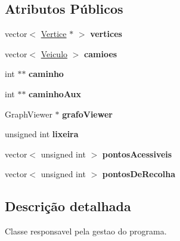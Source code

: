 \subsection*{Atributos Públicos}
\begin{DoxyCompactItemize}
\item 
\hypertarget{class_gestor_a36621d23bfbb03528e02156d6db98d1f}{vector$<$ \hyperlink{class_vertice}{Vertice} $\ast$ $>$ {\bfseries vertices}}\label{class_gestor_a36621d23bfbb03528e02156d6db98d1f}

\item 
\hypertarget{class_gestor_a163c7e5d2f461326bd5278569b2c50e0}{vector$<$ \hyperlink{class_veiculo}{Veiculo} $>$ {\bfseries camioes}}\label{class_gestor_a163c7e5d2f461326bd5278569b2c50e0}

\item 
\hypertarget{class_gestor_ac31b8b9f6a11e8ad3c3a4ee4b24ef1f9}{int $\ast$$\ast$ {\bfseries caminho}}\label{class_gestor_ac31b8b9f6a11e8ad3c3a4ee4b24ef1f9}

\item 
\hypertarget{class_gestor_ac8ddb489e5cba88a19768dd8a9d2aa11}{int $\ast$$\ast$ {\bfseries caminho\-Aux}}\label{class_gestor_ac8ddb489e5cba88a19768dd8a9d2aa11}

\item 
\hypertarget{class_gestor_a0c6417a41d99047374e7e16a57ff72a7}{Graph\-Viewer $\ast$ {\bfseries grafo\-Viewer}}\label{class_gestor_a0c6417a41d99047374e7e16a57ff72a7}

\item 
\hypertarget{class_gestor_aed174a242efffcdef8423c03bf975f9b}{unsigned int {\bfseries lixeira}}\label{class_gestor_aed174a242efffcdef8423c03bf975f9b}

\item 
\hypertarget{class_gestor_a0ca89c4359875a8545be97dab8e3b045}{vector$<$ unsigned int $>$ {\bfseries pontos\-Acessiveis}}\label{class_gestor_a0ca89c4359875a8545be97dab8e3b045}

\item 
\hypertarget{class_gestor_a983d0d701e6b6a01669f5d07a2be07eb}{vector$<$ unsigned int $>$ {\bfseries pontos\-De\-Recolha}}\label{class_gestor_a983d0d701e6b6a01669f5d07a2be07eb}

\end{DoxyCompactItemize}


\subsection{Descrição detalhada}
Classe responsavel pela gestao do programa. 

